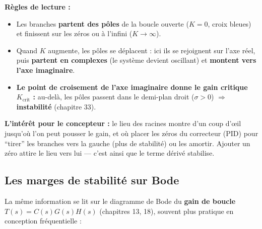 \documentclass[12pt,a4paper,twoside]{book}
\begin{document}
\begin{formule}
\textbf{Règles de lecture :}
\begin{itemize}[nosep]
\item Les branches \textbf{partent des pôles} de la boucle ouverte ($K = 0$, croix bleues) et finissent sur les zéros ou à l'infini ($K \to \infty$).
\item Quand $K$ augmente, les pôles se déplacent : ici ils se rejoignent sur l'axe réel, puis \textbf{partent en complexes} (le système devient oscillant) et \textbf{montent vers l'axe imaginaire}.
\item \textbf{Le point de croisement de l'axe imaginaire donne le gain critique $K_{\text{crit}}$ :} au-delà, les pôles passent dans le demi-plan droit ($\sigma > 0$) $\Rightarrow$ \textbf{instabilité} (chapitre 33).
\end{itemize}
\textbf{L'intérêt pour le concepteur :} le lieu des racines montre d'un coup d'œil jusqu'où l'on peut pousser le gain, et où placer les zéros du correcteur (PID) pour ``tirer'' les branches vers la gauche (plus de stabilité) ou les amortir. Ajouter un zéro attire le lieu vers lui --- c'est ainsi que le terme dérivé stabilise.
\end{formule}

\subsection{Les marges de stabilité sur Bode}

\begin{formule}
La même information se lit sur le diagramme de Bode du \textbf{gain de boucle} $T(s) = C(s)G(s)H(s)$ (chapitres 13, 18), souvent plus pratique en conception fréquentielle :
\end{formule}

\begin{center}
\end{center}
\end{document}
